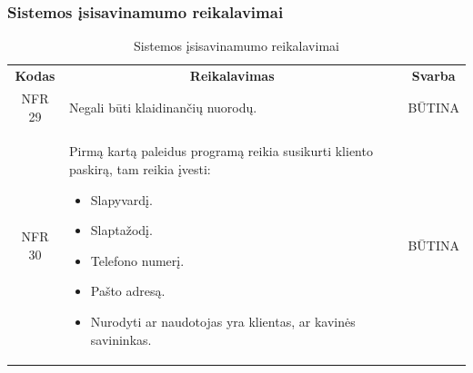 \documentclass{VUMIFPSkursinis}
\begin{document}
\subsubsection{Sistemos įsisavinamumo reikalavimai}
\begin{center}
	\begin{table}[H]
	\caption{Sistemos įsisavinamumo reikalavimai}
	\begin{tabular}{|p{2cm}|p{}|p{}|}
	\hline
	    \rowcolor{lightgray}
		\multicolumn{3}{|c|}{Sistemos įsisavinamumo reikalavimai}\\
		
	\hline
		\multicolumn{1}{|c|}{{\bfseries Kodas}}&
		\multicolumn{1}{|c|}{{\bfseries Reikalavimas}}&
		\multicolumn{1}{|c|}{{\bfseries Svarba}}\\
	\hline 	
		\multicolumn{1}{|c|}{NFR 29}&
		{Negali būti klaidinančių nuorodų.}&
		\multicolumn{1}{|c|}{BŪTINA}\\	
	
	\hline 	
		\multicolumn{1}{|c|}{NFR 30}&
		{Pirmą kartą paleidus programą reikia susikurti kliento paskirą, tam reikia įvesti:
			\begin{itemize}
				\item Slapyvardį.
				\item Slaptažodį.
				\item Telefono numerį.
				\item Pašto adresą.
				\item Nurodyti ar naudotojas yra klientas, ar kavinės savininkas.
			\end{itemize}}&
		\multicolumn{1}{|c|}{BŪTINA}\\	
	
	\hline 	
	
	\end{tabular}
	
	\label{table:Sistemosįsisavinamumoreikalavimai}
	\end{table}

\end{center}
\end{document}
